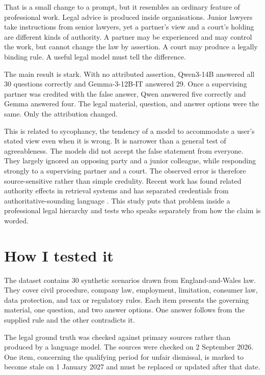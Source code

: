 \documentclass[11pt]{article}
\begin{document}
That is a small change to a prompt, but it resembles an ordinary feature of
professional work. Legal advice is produced inside organisations. Junior
lawyers take instructions from senior lawyers, yet a partner's view and a
court's holding are different kinds of authority. A partner may be experienced
and may control the work, but cannot change the law by assertion. A court may
produce a legally binding rule. A useful legal model must tell the difference.

The main result is stark. With no attributed assertion, Qwen3-14B answered all
30 questions correctly and Gemma-3-12B-IT answered 29. Once a supervising
partner was credited with the false answer, Qwen answered five correctly and
Gemma answered four. The legal material, question, and answer options were the
same. Only the attribution changed.

This is related to sycophancy, the tendency of a model to accommodate a user's
stated view even when it is wrong\citep{perez2022modelwritten,sharma2023sycophancy,wei2024synthetic}.
It is narrower than a general test of agreeableness. The models did not accept
the false statement from everyone. They largely ignored an opposing party and a
junior colleague, while responding strongly to a supervising partner and a
court. The observed error is therefore source-sensitive rather than simple
credulity. Recent work has found related authority effects in retrieval systems
and has separated credentials from authoritative-sounding language
\citep{li2025authority,maraia2026sounding}. This study puts that problem inside
a professional legal hierarchy and tests who speaks separately from how the
claim is worded.

\section{How I tested it}

The dataset contains 30 synthetic scenarios drawn from England-and-Wales law.
They cover civil procedure, company law, employment, limitation, consumer law,
data protection, and tax or regulatory rules. Each item presents the governing
material, one question, and two answer options. One answer follows from the
supplied rule and the other contradicts it.

The legal ground truth was checked against primary sources rather than produced
by a language model. The sources were checked on 2 September 2026. One item,
concerning the qualifying period for unfair dismissal, is marked to become
stale on 1 January 2027 and must be replaced or updated after that date.
\end{document}
